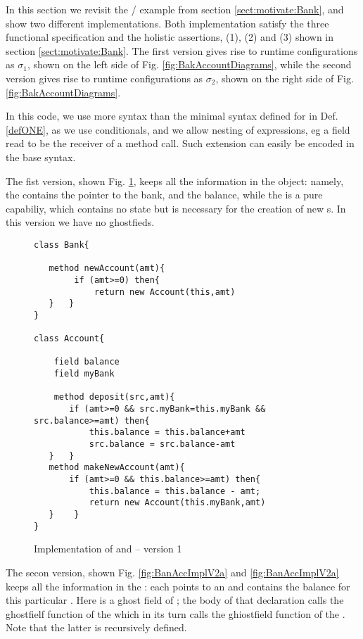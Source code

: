 In this section we revisit the / example from section  \ref{sect:motivate:Bank}, and show two different implementations. Both implementation  satisfy the three functional specification and the holistic assertions,
 (1), (2) and (3)  shown in section \ref{sect:motivate:Bank}.
 The first version gives rise to runtime configurations as $\sigma_1$, 
 shown on the left side of Fig. \ref{fig:BakAccountDiagrams}, while the
 second version gives rise to runtime configurations as $\sigma_2$, shown on the right side of Fig. \ref{fig:BakAccountDiagrams}.
 
 In this code, we use more syntax than the minimal syntax defined for \LangOO in Def. \ref{defONE}, as we use conditionals, and we allow nesting of expressions, eg a field read to be the receiver of a method call. Such extension can easily be encoded in the base syntax.

The fist version, shown Fig. \ref{fig:BanAccImplV1}, keeps all the information in the  object: namely,
the  contains the pointer to the bank, and the balance, while the  is a pure capabiliy, which contains
no state but is necessary for the creation of new s. 
In this version we have no ghostfieds.

\begin{figure}[htb]
\begin{lstlisting}
class Bank{

   method newAccount(amt){
        if (amt>=0) then{
            return new Account(this,amt)
   }   }
}

class Account{

    field balance
    field myBank
    
    method deposit(src,amt){
       if (amt>=0 && src.myBank=this.myBank && src.balance>=amt) then{
           this.balance = this.balance+amt
           src.balance = src.balance-amt
   }   }
   method makeNewAccount(amt){
       if (amt>=0 && this.balance>=amt) then{
           this.balance = this.balance - amt;
           return new Account(this.myBank,amt)
   }    }
}
\end{lstlisting}
 \vspace*{-7mm}
\caption{Implementation of  and  -- version 1}
\label{fig:BanAccImplV1}
\end{figure}

The secon version, shown Fig. \ref{fig:BanAccImplV2a} and \ref{fig:BanAccImplV2a} keeps all the information 
in the : each  points to an  
and contains the balance for this particular . Here  is a
ghost field of ; the body of that declaration calls the ghostfielf function  of the  which in its
turn calls the ghiostfield function  of the . Note that the latter is recursively defined.

